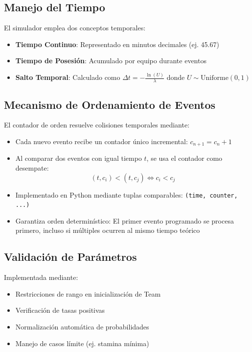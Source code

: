 \documentclass{article}
\begin{document}
\subsection{Manejo del Tiempo}
El simulador emplea dos conceptos temporales:
\begin{itemize}
    \item \textbf{Tiempo Continuo}: Representado en minutos decimales (ej. 45.67)
    \item \textbf{Tiempo de Posesión}: Acumulado por equipo durante eventos
    \item \textbf{Salto Temporal}: Calculado como $\Delta t = -\frac{\ln(U)}{\lambda}$ donde $U \sim \text{Uniforme}(0,1)$
\end{itemize}

\subsection{Mecanismo de Ordenamiento de Eventos}
El contador de orden resuelve colisiones temporales mediante:
\begin{itemize}
    \item Cada nuevo evento recibe un contador único incremental: $c_{n+1} = c_n + 1$
    \item Al comparar dos eventos con igual tiempo $t$, se usa el contador como desempate:
    \begin{equation*}
        (t, c_i) < (t, c_j) \iff c_i < c_j
    \end{equation*}
    \item Implementado en Python mediante tuplas comparables: \texttt{(time, counter, ...)}
    \item Garantiza orden determinístico: El primer evento programado se procesa primero, incluso si múltiples ocurren al mismo tiempo teórico
\end{itemize}

\subsection{Validación de Parámetros}
Implementada mediante:
\begin{itemize}
    \item Restricciones de rango en inicialización de Team
    \item Verificación de tasas positivas
    \item Normalización automática de probabilidades
    \item Manejo de casos límite (ej. stamina mínima)
\end{itemize}
\end{document}
